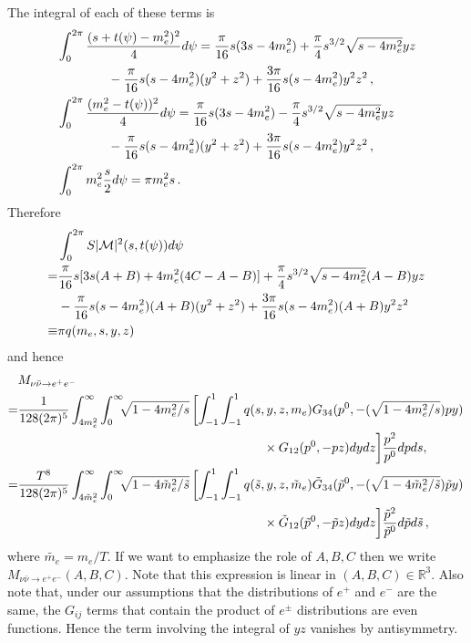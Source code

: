   The integral of each of these terms is
 \begin{align}
&\int_0^{2\pi}\frac{(s+t(\psi)-m_e^2)^2}{4}d\psi=\frac{\pi}{16}s(3s-4m_e^2)+\frac{\pi}{4}s^{3/2}\sqrt{s-4m_e^2}yz\\
&\qquad\qquad-\frac{\pi}{16}s(s-4m_e^2)(y^2+z^2)+\frac{3\pi}{16}s(s-4m_e^2)y^2z^2\,,\notag\\
&\int_0^{2\pi} \frac{(m_e^2-t(\psi))^2}{4}d\psi=\frac{\pi}{16}s(3s-4m_e^2)-\frac{\pi}{4}s^{3/2}\sqrt{s-4m_e^2}yz\notag\\
&\qquad\qquad-\frac{\pi}{16}s(s-4m_e^2)(y^2+z^2)+\frac{3\pi}{16}s(s-4m_e^2)y^2z^2\,,\notag\\
&\int_0^{2\pi} m_e^2\frac{s}{2} d\psi=\pi m_e^2s\,.\notag
\end{align}
Therefore 
\begin{align}
&\int_0^{2\pi} S |\mathcal{M}|^2 (s,t(\psi))d\psi\\
=&\frac{\pi}{16}s[3s(A+B)+4m_e^2(4C-A-B)]+\frac{\pi}{4}s^{3/2}\sqrt{s-4m_e^2}(A-B)yz\notag\\
&-\frac{\pi}{16}s(s-4m_e^2)(A+B)(y^2+z^2)+\frac{3\pi}{16}s(s-4m_e^2)(A+B)y^2z^2\notag\\
\equiv& \pi q(m_e,s,y,z)\notag
\end{align}
and hence
\begin{align}
&M_{\nu\bar\nu\rightarrow e^+e^-}\\
=&\frac{1}{128(2\pi)^5 }\int_{4m_e^2}^\infty\int_0^\infty\!\!\!\sqrt{1-4m_e^2/s}\left[\int_{-1}^1\int_{-1}^1q(s,y,z,m_e)G_{34}(p^0,-(\sqrt{1-4m_e^2/s})p y)\right.\notag\\
&\hspace{68mm}\times G_{12}(p^0,-p z)dydz\bigg]\frac{ p^2}{p^0}dpds,\notag\\
=&\frac{T^8}{128(2\pi)^5 }\int_{4\tilde m_e^2}^\infty\int_0^\infty\!\!\!\sqrt{1-4\tilde m_e^2/\tilde s}\left[\int_{-1}^1 \int_{-1}^1q(\tilde s,y,z,\tilde m_e)\tilde G_{34}(\tilde p^0,-(\sqrt{1-4\tilde{m}_e^2/\tilde s})\tilde p y)\right.\notag\\
&\hspace{68mm}\times\tilde G_{12}(\tilde p^0,-\tilde p z)dydz\bigg] \frac{ \tilde p^2}{\tilde p^0}d\tilde pd\tilde s\,,\notag
\end{align}
where $\tilde{m_e}=m_e/T$.  If we want to emphasize the role of $A,B,C$ then we write $M_{\nu\bar\nu\rightarrow e^+e^-}(A,B,C)$.  Note that this expression is linear in $(A,B,C)\in\mathbb{R}^3$. Also note that, under our assumptions that the distributions of $e^+$ and $e^-$ are the same,  the $G_{ij}$ terms that contain the product of $e^\pm$ distributions are even functions. Hence the term involving the integral of $yz$ vanishes by antisymmetry.

